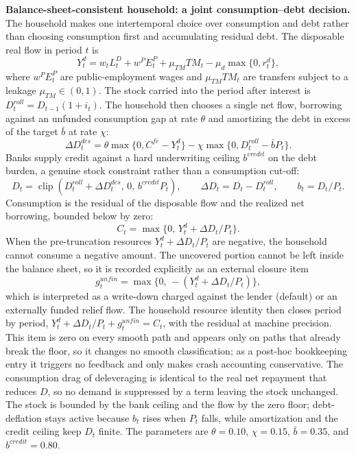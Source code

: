 \documentclass[review,12pt]{elsarticle}
\theoremstyle{plain}
\theoremstyle{definition}
\theoremstyle{remark}
\begin{document}
\textbf{Balance-sheet-consistent household: a joint consumption--debt decision.}
The household makes one intertemporal choice over consumption and debt rather than choosing consumption first and accumulating residual debt. The disposable real flow in period $t$ is
\begin{equation}
Y_t^d=w_tL_t^D+w^P E_t^P+\mu_{TM}TM_t-\mu_d\max\{0,r_t^d\},
\end{equation}
where $w^P E_t^P$ are public-employment wages and $\mu_{TM}TM_t$ are transfers subject to a leakage $\mu_{TM}\in(0,1)$. The stock carried into the period after interest is $D_t^{roll}=D_{t-1}(1+i_t)$. The household then chooses a single net flow, borrowing against an unfunded consumption gap at rate $\theta$ and amortizing the debt in excess of the target $\bar b$ at rate $\chi$:
\begin{equation}
\Delta D_t^{des}=\theta\max\{0,C^{fe}-Y_t^d\}
-\chi\max\{0,D_t^{roll}-\bar b P_t\}.
\end{equation}
Banks supply credit against a hard underwriting ceiling $b^{credit}$ on the debt burden, a genuine stock constraint rather than a consumption cut-off:
\begin{equation}
D_t=\operatorname{clip}\!\left(D_t^{roll}+\Delta D_t^{des},\,0,\,b^{credit}P_t\right),
\qquad \Delta D_t=D_t-D_t^{roll},\qquad b_t=D_t/P_t.
\end{equation}
Consumption is the residual of the disposable flow and the realized net borrowing, bounded below by zero:
\begin{equation}
C_t=\max\{0,\,Y_t^d+\Delta D_t/P_t\}.
\end{equation}
When the pre-truncation resources $Y_t^d+\Delta D_t/P_t$ are negative, the household cannot consume a negative amount. The uncovered portion cannot be left inside the balance sheet, so it is recorded explicitly as an external closure item
\begin{equation}
g_t^{unfin}=\max\{0,\,-(Y_t^d+\Delta D_t/P_t)\},
\end{equation}
which is interpreted as a write-down charged against the lender (default) or an externally funded relief flow. The household resource identity then closes period by period, $Y_t^d+\Delta D_t/P_t+g_t^{unfin}=C_t$, with the residual at machine precision. This item is zero on every smooth path and appears only on paths that already break the floor, so it changes no smooth classification; as a post-hoc bookkeeping entry it triggers no feedback and only makes crash accounting conservative. The consumption drag of deleveraging is identical to the real net repayment that reduces $D$, so no demand is suppressed by a term leaving the stock unchanged. The stock is bounded by the bank ceiling and the flow by the zero floor; debt-deflation stays active because $b_t$ rises when $P_t$ falls, while amortization and the credit ceiling keep $D_t$ finite. The parameters are $\theta=0.10$, $\chi=0.15$, $\bar b=0.35$, and $b^{credit}=0.80$.
\end{document}
